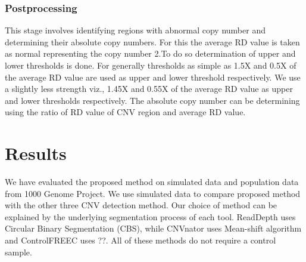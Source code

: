 \documentclass[twocolumn,oneside,conference]
{IEEEtran}
\begin{document}
\subsubsection{Postprocessing}
 This stage involves identifying regions with abnormal copy number and determining their absolute copy numbers. For this the average RD value is taken as normal representing the copy number 2.To do so determination of upper and lower thresholds is done. For generally thresholds as simple as 1.5X and 0.5X of the average RD value are used as upper and lower threshold respectively. We use a slightly less strength viz., 1.45X and 0.55X of the average RD value as upper and lower thresholds respectively. The absolute copy number can be determining using the ratio of RD value of CNV region and average RD value.   

\section{Results}
We have evaluated the proposed method on simulated data and population data from 1000 Genome Project. We use simulated data to compare proposed method with the other three CNV detection method. Our choice of method can be explained by the underlying segmentation process of each tool. ReadDepth uses Circular Binary Segmentation (CBS), while CNVnator uses Mean-shift algorithm and ControlFREEC uses ??. All of these methods do not require a control sample. 
\end{document}
